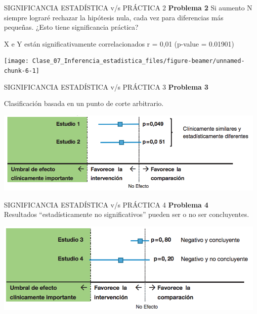 \documentclass[
  ignorenonframetext,
]{beamer}
\begin{document}
\begin{frame}{SIGNIFICANCIA ESTADÍSTICA v/s PRÁCTICA 2}
\protect\hypertarget{significancia-estaduxedstica-vs-pruxe1ctica-2}{}
\textbf{Problema 2} Si aumento N siempre lograré rechazar la hipótesis
nula, cada vez para diferencias más pequeñas. ¿Esto tiene significancia
práctica?

X e Y están significativamente correlacionados r = 0,01 (p-value =
0.01901)

\texttt{[image: Clase\_07\_Inferencia\_estadistica\_files/figure-beamer/unnamed-chunk-6-1]}
\end{frame}

\begin{frame}{SIGNIFICANCIA ESTADÍSTICA v/s PRÁCTICA 3}
\protect\hypertarget{significancia-estaduxedstica-vs-pruxe1ctica-3}{}
\textbf{Problema 3}

Clasificación basada en un punto de corte arbitrario.

\includegraphics[width=1\linewidth]{punto_de_corte}
\end{frame}

\begin{frame}{SIGNIFICANCIA ESTADÍSTICA v/s PRÁCTICA 4}
\protect\hypertarget{significancia-estaduxedstica-vs-pruxe1ctica-4}{}
\textbf{Problema 4}\\
Resultados ``estadísticamente no significativos'' pueden ser o no ser
concluyentes.

\includegraphics[width=1\linewidth]{no_concluyente}
\end{frame}
\end{document}
